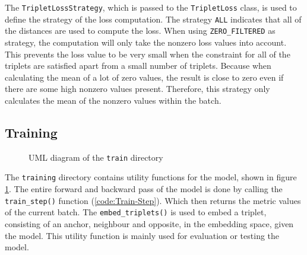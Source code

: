 \newline
\newline
The \texttt{TripletLossStrategy}, which is passed to the \texttt{TripletLoss} class, is used to define the strategy of the loss computation. The strategy \texttt{ALL} indicates that all of the distances are used to compute the loss. When using \texttt{ZERO\_FILTERED} as strategy, the computation will only take the nonzero loss values into account. This prevents the loss value to be very small when the constraint for all of the triplets are satisfied apart from a small number of triplets. Because when calculating the mean of a lot of zero values, the result is close to zero even if there are some high nonzero values present. Therefore, this strategy only calculates the mean of the nonzero values within the batch.

\subsection{Training}
\label{sub:Component-Training}
\begin{figure}[htbp]
	\centering
	\caption{UML diagram of the \texttt{train} directory}
	\label{fig:UML-Train}
\end{figure}
\noindent
The \texttt{training} directory contains utility functions for the model, shown in figure \ref{fig:UML-Train}. The entire forward and backward pass of the model is done by calling the \texttt{train\_step()} function (\ref{code:Train-Step}). Which then returns the metric values of the current batch.
\newline
\newline
The \texttt{embed\_triplets()} is used to embed a triplet, consisting of an anchor, neighbour and opposite, in the embedding space, given the model. This utility function is mainly used for evaluation or testing the model.

